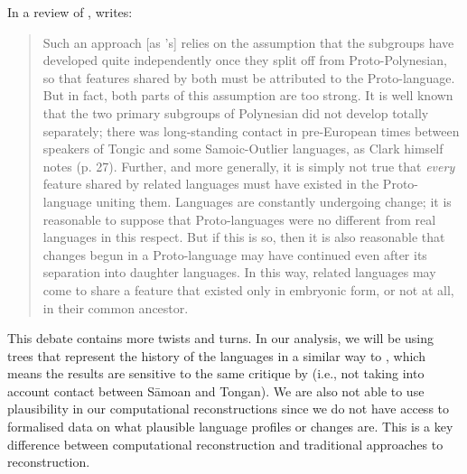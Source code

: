 \documentclass[12pt,letterpaper]{article}
\begin{document}
In a review of \citet{clark1973aspects}, \citet[539]{chung1977aspects} writes:

\begin{quotation}
\noindent Such an approach [as \citeauthor{clark1973aspects}'s] relies on the assumption that the subgroups have developed quite independently once they split off from Proto-Polynesian, so that features shared by both must be attributed to the Proto-language. But in fact, both parts of this assumption are too strong. It is well known that the two primary subgroups of Polynesian did not develop totally separately; there was long-standing contact in pre-European times between speakers of Tongic and some Samoic-Outlier languages, as Clark himself notes (p. 27). Further, and more generally, it is simply not true that \textit{every} feature shared by related languages must have existed in the Proto-language uniting them. Languages are constantly undergoing change; it is reasonable to suppose that Proto-languages were no different from real languages in this respect. But if this is so, then it is also reasonable that changes begun in a Proto-language may have continued even after its separation into daughter languages. In this way, related languages may come to share a feature that existed only in embryonic form, or not at all, in their common ancestor.
\end{quotation}

This debate contains more twists and turns. In our analysis, we will be using trees that represent the history of the languages in a similar way to \citet{clark1973aspects}, which means the results are sensitive to the same critique by \citet{chung1977aspects} (i.e., not taking into account contact between S\={a}moan and Tongan). We are also not able to use plausibility in our computational reconstructions since we do not have access to formalised data on what plausible language profiles or changes are. This is a key difference between computational reconstruction and traditional approaches to reconstruction.

\end{document}
